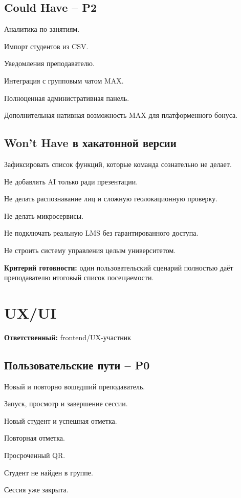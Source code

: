 \documentclass[11pt,a4paper]{article}
\newcommand{\PZero}{\textcolor{PZero}{\textbf{P0}}}
\newcommand{\PTwo}{\textcolor{PTwo}{\textbf{P2}}}
\newcommand{\done}[1]{\textbf{Критерий готовности:} #1}
\newcommand{\owner}[1]{\textcolor{Muted}{\textbf{Ответственный:} #1}}
\begin{document}
\subsection{Could Have -- \PTwo}
\begin{tasklist}
  \item Аналитика по занятиям.
  \item Импорт студентов из CSV.
  \item Уведомления преподавателю.
  \item Интеграция с групповым чатом MAX.
  \item Полноценная административная панель.
  \item Дополнительная нативная возможность MAX для платформенного бонуса.
\end{tasklist}

\subsection{Won't Have в хакатонной версии}
\begin{tasklist}
  \item Зафиксировать список функций, которые команда сознательно не делает.
  \item Не добавлять AI только ради презентации.
  \item Не делать распознавание лиц и сложную геолокационную проверку.
  \item Не делать микросервисы.
  \item Не подключать реальную LMS без гарантированного доступа.
  \item Не строить систему управления целым университетом.
\end{tasklist}
\done{один пользовательский сценарий полностью даёт преподавателю итоговый список посещаемости.}

\section{UX/UI}
\owner{frontend/UX-участник}

\subsection{Пользовательские пути -- \PZero}
\begin{tasklist}
  \item Новый и повторно вошедший преподаватель.
  \item Запуск, просмотр и завершение сессии.
  \item Новый студент и успешная отметка.
  \item Повторная отметка.
  \item Просроченный QR.
  \item Студент не найден в группе.
  \item Сессия уже закрыта.
\end{tasklist}
\end{document}
